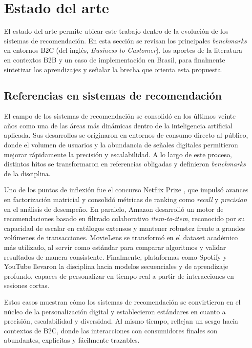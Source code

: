 
\section{Estado del arte}

El estado del arte permite ubicar este trabajo dentro de la evolución de los sistemas de recomendación. En esta sección se revisan los principales \textit{benchmarks} en entornos B2C (del inglés, \textit{Business to Customer}), los aportes de la literatura en contextos B2B y un caso de implementación en Brasil, para finalmente sintetizar los aprendizajes y señalar la brecha que orienta esta propuesta.

\subsection{Referencias en sistemas de recomendación}

El campo de los sistemas de recomendación se consolidó en los últimos veinte años como una de las áreas más dinámicas dentro de la inteligencia artificial aplicada. Sus desarrollos se originaron en entornos de consumo directo al público, donde el volumen de usuarios y la abundancia de señales digitales permitieron mejorar rápidamente la precisión y escalabilidad. A lo largo de este proceso, distintos hitos se transformaron en referencias obligadas y definieron \textit{benchmarks} de la disciplina.

Uno de los puntos de inflexión fue el concurso Netflix Prize \cite{ARTICLE:NetflixPrize}, que impulsó avances en factorización matricial y consolidó métricas de ranking como \textit{recall} y \textit{precision} en el análisis de desempeño. En paralelo, Amazon desarrolló un motor de recomendaciones basado en filtrado colaborativo \textit{item-to-item}, reconocido por su capacidad de escalar en catálogos extensos y mantener robustez frente a grandes volúmenes de transacciones. MovieLens \cite{ARTICLE:MovieLens} se transformó en el dataset académico más utilizado, al servir como estándar para comparar algoritmos y validar resultados de manera consistente. Finalmente, plataformas como Spotify y YouTube llevaron la disciplina hacia modelos secuenciales y de aprendizaje profundo, capaces de personalizar en tiempo real a partir de interacciones en sesiones cortas.

Estos casos muestran cómo los sistemas de recomendación se convirtieron en el núcleo de la personalización digital y establecieron estándares en cuanto a precisión, escalabilidad y diversidad. Al mismo tiempo, reflejan un sesgo hacia contextos de  B2C, donde las interacciones con consumidores finales son abundantes, explícitas y fácilmente trazables.

